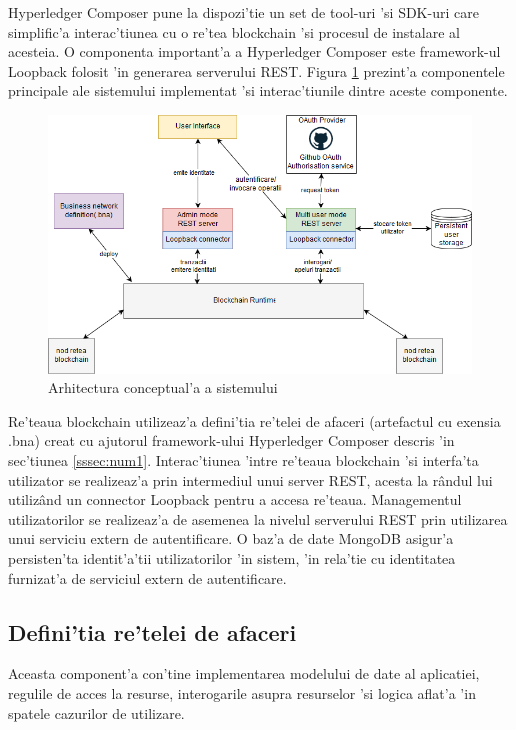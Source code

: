 \documentclass[12pt,a4paper,twoside]{report}
\begin{document}
    Hyperledger Composer pune la dispozi'tie un set de tool-uri 'si SDK-uri care simplific'a interac'tiunea cu o re'tea blockchain 'si procesul de instalare al acesteia. O componenta important'a a Hyperledger Composer este framework-ul Loopback folosit 'in generarea serverului REST. Figura \ref{fig:arhc} prezint'a componentele principale ale sistemului implementat 'si interac'tiunile dintre aceste componente.
    	\begin{figure}[H]
		\begin{center}
			\includegraphics[scale=0.50]{img/arhc.png}
			\caption{Arhitectura conceptual'a a sistemului}
  			\label{fig:arhc}
  		\end{center}
  		\end{figure}
  Re'teaua blockchain utilizeaz'a defini'tia re'telei de afaceri (artefactul cu exensia .bna) creat cu ajutorul framework-ului Hyperledger Composer descris 'in sec'tiunea \ref{sssec:num1}. Interac'tiunea 'intre re'teaua blockchain 'si interfa'ta utilizator se realizeaz'a prin intermediul unui server REST, acesta la r\^andul lui utiliz\^and un connector Loopback pentru a accesa re'teaua. Managementul utilizatorilor se realizeaz'a de asemenea la nivelul serverului REST prin utilizarea unui serviciu extern de autentificare. O baz'a de date MongoDB asigur'a persisten'ta identit'a'tii utilizatorilor 'in sistem, 'in rela'tie cu identitatea furnizat'a de serviciul extern de autentificare.
  
  \subsection{Defini'tia re'telei de afaceri}
  
  Aceasta component'a con'tine implementarea modelului de date al aplicatiei, regulile de acces la resurse, interogarile asupra resurselor 'si logica aflat'a 'in spatele cazurilor de utilizare. 
  
\end{document}
